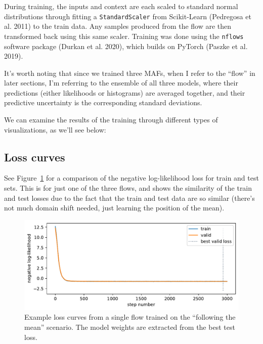\documentclass[
  11pt,
  numbers=noendperiod]{book}
\begin{document}
During training, the inputs and context are each scaled to standard
normal distributions through fitting a \texttt{StandardScaler} from
Scikit-Learn (Pedregosa et al. 2011) to the train data. Any samples
produced from the flow are then transformed back using this same scaler.
Training was done using the \texttt{nflows} software package (Durkan et
al. 2020), which builds on PyTorch (Paszke et al. 2019).

It's worth noting that since we trained three MAFs, when I refer to the
``flow'' in later sections, I'm referring to the ensemble of all three
models, where their predictions (either likelihoods or histograms) are
averaged together, and their predictive uncertainty is the corresponding
standard deviations.

We can examine the results of the training through different types of
visualizations, as we'll see below:

\hypertarget{loss-curves}{%
\subsection{Loss curves}\label{loss-curves}}

See Figure~\ref{fig-simple-loss} for a comparison of the negative
log-likelihood loss for train and test sets. This is for just one of the
three flows, and shows the similarity of the train and test losses due
to the fact that the train and test data are so similar (there's not
much domain shift needed, just learning the position of the mean).

\begin{figure}

{\centering \includegraphics{./images/flows/simple/simple_example_loss.pdf}

}

\caption{\label{fig-simple-loss}Example loss curves from a single flow
trained on the ``following the mean'' scenario. The model weights are
extracted from the best test loss.}

\end{figure}
\end{document}
